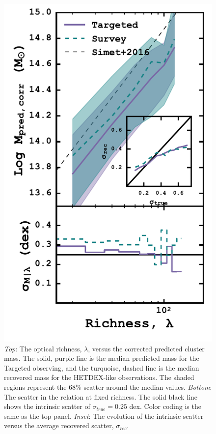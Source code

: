 \documentclass[fleqn,usenatbib]{mnras}
\begin{document}
\begin{figure} 
	\includegraphics[width=\columnwidth]{figures/massRichness.pdf} 
	\caption[Optical richness versus corrected cluster mass]{\emph{Top}: The optical richness, $\lambda$, versus the corrected predicted cluster mass. The solid, purple line is the median predicted mass for the Targeted observing, and the turquoise, dashed line is the median recovered mass for the HETDEX-like observations. The shaded regions represent the 68\% scatter around the median values. \emph{Bottom}: The scatter in the relation at fixed richness. The solid black line shows the intrinsic scatter of $\sigma_{true}=0.25$ dex. Color coding is the same as the top panel. \emph{Inset}: The evolution of the intrinsic scatter versus the average recovered scatter, $\sigma_{rec}$.}
	\label{fig:mass richness} 
\end{figure}
\end{document}
